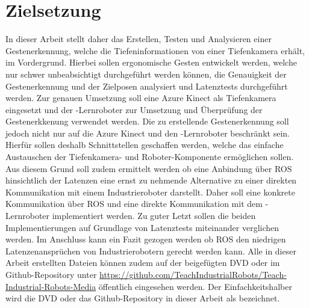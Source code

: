 \section{Zielsetzung} \label{sec:zielsetzung} %
In dieser Arbeit stellt daher das Erstellen, Testen und Analysieren einer Gestenerkennung, welche die Tiefeninformationen von einer Tiefenkamera erhält, im Vordergrund. Hierbei sollen ergonomische Gesten entwickelt werden, welche nur schwer unbeabsichtigt durchgeführt werden können, die Genauigkeit der Gestenerkennung und der Zielposen analysiert und Latenztests durchgeführt werden. Zur genauen Umsetzung soll eine Azure Kinect als Tiefenkamera eingesetzt und der -Lernroboter zur Umsetzung und Überprüfung der Gestenerkkenung verwendet werden. Die zu erstellende Gestenerkennung soll jedoch nicht nur auf die Azure Kinect und den -Lernroboter beschränkt sein. Hierfür sollen deshalb Schnittstellen geschaffen werden, welche das einfache Austauschen der Tiefenkamera- und Roboter-Komponente ermöglichen sollen. Aus diesem Grund soll zudem ermittelt werden ob eine Anbindung über ROS hinsichtlich der Latenzen eine ernst zu nehmende Alternative zu einer direkten Kommunikation mit einem Industrieroboter darstellt. Daher soll eine konkrete Kommunikation über ROS und eine direkte Kommunikation mit dem -Lernroboter implementiert werden. Zu guter Letzt sollen die beiden Implementierungen auf Grundlage von Latenztests miteinander verglichen werden. Im Anschluss kann ein Fazit gezogen werden ob ROS den niedrigen Latenzenansprüchen von Industrierobotern gerecht werden kann. Alle in dieser Arbeit erstellten Dateien können zudem auf der beigefügten DVD oder im Github-Repository unter \href{https://github.com/TeachIndustrialRobots/Teach-Industrial-Robots-Media}{https://github.com/TeachIndustrialRobots/Teach-Industrial-Robots-Media} öffentlich eingesehen werden. Der Einfachkeitshalber wird die DVD oder das Github-Repository in dieser Arbeit als  bezeichnet.
